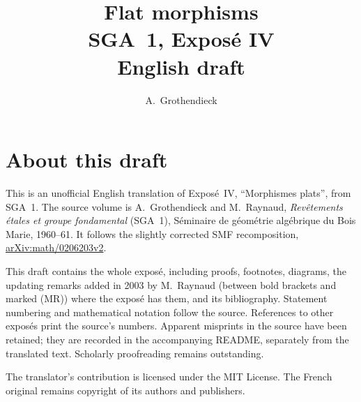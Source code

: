 \documentclass[11pt,a4paper,oneside]{amsbook}
\title[SGA~1, Expos\'e IV (English draft)]{Flat morphisms\\
{\normalsize SGA~1, Expos\'e IV\\English draft}}
\author{A.\ Grothendieck}
\date{}
\begin{document}
\frontmatter
\maketitle

\chapter*{About this draft}
This is an unofficial English translation of Expos\'e~IV,
``Morphismes plats'', from SGA~1. The source volume is
A.\ Grothendieck and M.\ Raynaud,
\textit{Rev\^etements \'etales et groupe fondamental} (SGA~1),
S\'eminaire de g\'eom\'etrie alg\'ebrique du Bois Marie, 1960--61.
It follows the slightly corrected SMF recomposition,
\href{https://arxiv.org/abs/math/0206203v2}{arXiv:math/0206203v2}.

This draft contains the whole expos\'e, including proofs, footnotes,
diagrams, the updating remarks added in 2003 by M.~Raynaud (between bold
brackets and marked (MR)) where the expos\'e has them, and its bibliography.
Statement numbering and mathematical notation follow the source.
References to other expos\'es print the source's numbers. Apparent
misprints in the source have been retained; they are recorded in the
accompanying README, separately from the translated text. Scholarly
proofreading remains outstanding.

The translator's contribution is licensed under
the MIT License.
The French original remains copyright of its authors and publishers.

\tableofcontents
\mainmatter
\setcounter{chapter}{3}


\end{document}
